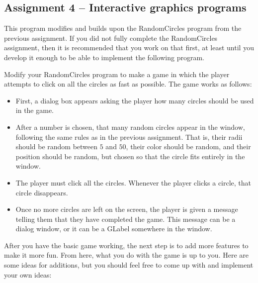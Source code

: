 \documentclass[11pt]{article}
\theoremstyle{plain}
\theoremstyle{definition}
\theoremstyle{remark}
\begin{document}
\begin{center}
\section*{Assignment 4 -- Interactive graphics programs}
\end{center}
This program modifies and builds upon the RandomCircles program from the
previous assignment. If you did not fully complete the RandomCircles assignment,
then it is recommended that you work on that first, at least until you develop
it enough to be able to implement the following program.

Modify your RandomCircles program to make a game in which the player attempts
to click on all the circles as fast as possible. The game works as follows:
\begin{itemize}
  \item First, a dialog box appears asking the player how many circles should be
    used in the game.
  \item After a number is chosen, that many random circles appear in the window,
    following the same rules as in the previous assignment. That is, their radii
    should be random between $5$ and $50$, their color should be random, and
    their position should be random, but chosen so that the circle fits entirely
    in the window.
  \item The player must click all the circles. Whenever the player clicks a
    circle, that circle disappears.
  \item Once no more circles are left on the screen, the player is given a
    message telling them that they have completed the game. This message can be
    a dialog window, or it can be a GLabel somewhere in the window.
\end{itemize}
After you have the basic game working, the next step is to add more features to
make it more fun. From here, what you do with the game is up to you. Here are
some ideas for additions, but you should feel free to come up with and implement
your own ideas:
\end{document}
